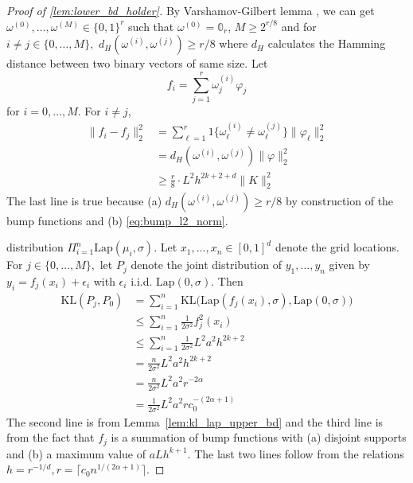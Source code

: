 \documentclass[ejs,noshowframe]{imsart}
\theoremstyle{plain}
\theoremstyle{definition}
\newcommand{\R}{\mathbb{R}}
\newcommand{\lap}{\mathrm{Lap}}
\newcommand{\kl}{\mathrm{KL}}
\begin{document}
\begin{appendix}
\begin{proof}[Proof of \autoref{lem:lower_bd_holder}]
By Varshamov-Gilbert lemma \citep[see Lemma 2.9 in][]{tsybakov2009introduction}, 
we can get  $
\omega^{(0)}, \dots, \omega^{(M)}  \in \{0,1\}^r$
such that
$\omega^{(0)} = \mathbb{0}_r$,
$M \geq 2^{r/8}$
and
for $i \neq  j \in \{ 0, \dots, M \},$
$d_H( \omega^{(i)}, \omega^{(j)} ) \geq r/8$
where $d_H$ calculates the Hamming distance between two binary vectors of same 
size.
Let 
	$$ f_i = \sum_{j=1}^r \omega^{(i)}_j \varphi_j $$
for $i=0,\dots,M.$
For $i \neq j$, 
\begin{align}
\| f_i - f_j \|_2^2
&= \sum_{\ell=1}^r 1\{ \omega^{(i)}_\ell \neq \omega^{(j)}_\ell\} \| 
\varphi_\ell \|_2^2 \\
&= d_H( \omega^{(i)}, \omega^{(j)})  \| \varphi\|_2^2 \\
\label{eq:fi_fj_lower_bd}
&\ge \frac{r}{8} \cdot L^2 h^{2k+2+d} \| K \|_2^2
\end{align}
The last line is true because  (a) $d_H( \omega^{(i)}, \omega^{(j)}) \ge r/8$ 
by construction of the 
bump functions and
(b)  \eqref{eq:bump_l2_norm}.

distribution $\Pi_{i=1}^n \lap(\mu_i, \sigma).$
Let $x_1, \dots, x_n \in [0,1]^d$ denote the grid locations.
For $j \in \{ 0, \dots, M\},$ let $P_j$ denote the joint distribution of $y_1, 
\dots, y_n$ given by $y_i = f_j(x_i) + \epsilon_i$ with $\epsilon_i$ i.i.d. 
$\lap(0,\sigma).$ 
Then
\begin{align}
\kl (P_j, P_0)
&= \sum_{i = 1}^n \kl \big(\lap(f_j(x_i), \sigma), \lap(0, \sigma)\big)\\
&\leq 
\sum_{i = 1}^n \frac{1}{2\sigma^2} f_j^2(x_i)\\
&\leq 
\sum_{i = 1}^n \frac{1}{2\sigma^2} L^2 a^2 h^{2k+2}\\
&=\frac{n}{2\sigma^2} L^2 a^2 h^{2k+2}\\
&= \frac{n}{2\sigma^2} L^2 a^2 r^{-2\alpha}\\
\label{eq:kl_Pj_P0_bd1}
&= \frac{1}{2\sigma^2} L^2 a^2 r c_0^{-(2\alpha+1)}
\end{align}
The second line is from Lemma~\ref{lem:kl_lap_upper_bd} and the third line is 
from the fact that $f_j$ is a summation of  bump functions with (a) disjoint 
supports and (b) a maximum value of 
$aL h^{k+1}.$
The last two lines follow from the relations $h = r^{-1/d}, r = \lceil c_0 
n^{1/(2\alpha+1)}\rceil.$


\end{proof}
\end{appendix}
\end{document}
